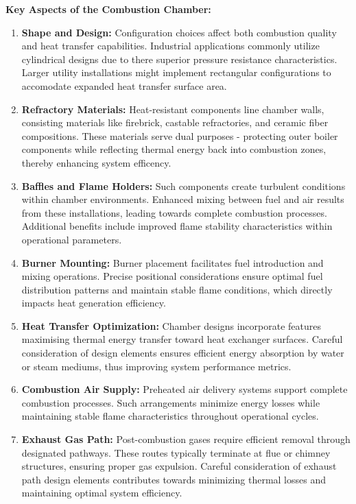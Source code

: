 \textbf{Key Aspects of the Combustion Chamber:}
\begin{enumerate}
    \item \textbf{Shape and Design:} Configuration choices affect both combustion quality and heat transfer capabilities. Industrial applications commonly utilize cylindrical designs due to there superior pressure resistance characteristics. Larger utility installations might implement rectangular configurations to accomodate expanded heat transfer surface area.
    \item \textbf{Refractory Materials:} Heat-resistant components line chamber walls, consisting materials like firebrick, castable refractories, and ceramic fiber compositions. These materials serve dual purposes - protecting outer boiler components while reflecting thermal energy back into combustion zones, thereby enhancing system efficency.
    \item \textbf{Baffles and Flame Holders:} Such components create turbulent conditions within chamber environments. Enhanced mixing between fuel and air results from these installations, leading towards complete combustion processes. Additional benefits include improved flame stability characteristics within operational parameters.
    \item \textbf{Burner Mounting:} Burner placement facilitates fuel introduction and mixing operations. Precise positional considerations ensure optimal fuel distribution patterns and maintain stable flame conditions, which directly impacts heat generation efficiency.
    \item \textbf{Heat Transfer Optimization:} Chamber designs incorporate features maximising thermal energy transfer toward heat exchanger surfaces. Careful consideration of design elements ensures efficient energy absorption by water or steam mediums, thus improving system performance metrics.
    \item \textbf{Combustion Air Supply:} Preheated air delivery systems support complete combustion processes. Such arrangements minimize energy losses while maintaining stable flame characteristics throughout operational cycles.
    \item \textbf{Exhaust Gas Path:} Post-combustion gases require efficient removal through designated pathways. These routes typically terminate at flue or chimney structures, ensuring proper gas expulsion. Careful consideration of exhaust path design elements contributes towards minimizing thermal losses and maintaining optimal system efficiency.
\end{enumerate}

